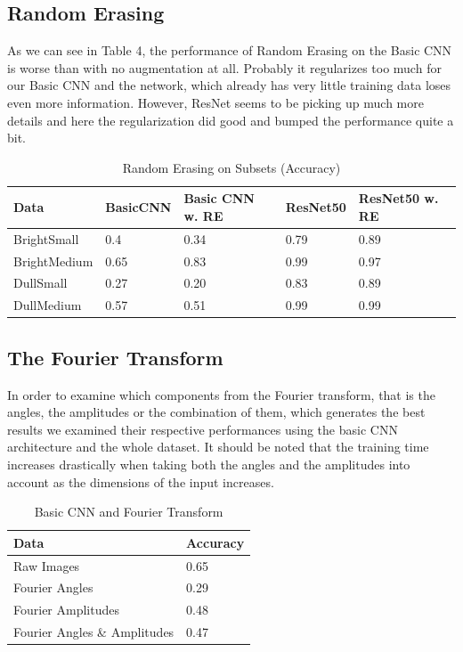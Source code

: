 \documentclass{article}
\begin{document}
\subsection{Random Erasing}

As we can see in Table 4, the performance of Random Erasing on the Basic CNN is worse than with no augmentation at all. Probably it regularizes too much for our Basic CNN and the network, which already has very little training data loses even more information. However, ResNet seems to be picking up much more details and here the regularization did good and bumped the performance quite a bit. 

\begin{table}[H]
	\caption{Random Erasing on Subsets (Accuracy)}
	\label{sample-table}
	\centering
	\begin{tabular}{lllll}
		\toprule
		Data & BasicCNN & Basic CNN w. RE & ResNet50 & ResNet50 w. RE \\
		\midrule
		BrightSmall   & 0.4 & 0.34 & 0.79 & 0.89  \\
		BrightMedium  & 0.65 & 0.83 & 0.99 & 0.97  \\
		DullSmall     & 0.27 & 0.20 & 0.83 & 0.89  \\
		DullMedium    & 0.57 & 0.51 & 0.99 & 0.99  \\
		\bottomrule
	\end{tabular}
\end{table}



\subsection{The Fourier Transform}

In order to examine which components from the Fourier transform, that is the angles, the amplitudes or the combination of them, which generates the best results we examined their respective performances using the basic CNN architecture and the whole dataset. It should be noted that the training time increases drastically when taking both the angles and the amplitudes into account as the dimensions of the input increases.

\begin{table}[H]
  \caption{Basic CNN and Fourier Transform}
  \label{sample-table}
  \centering
  \begin{tabular}{ll}
    \toprule
    Data & Accuracy \\
    \midrule
    Raw Images  & 0.65 \\
    Fourier Angles & 0.29   \\
    Fourier Amplitudes & 0.48 \\
    Fourier Angles \& Amplitudes & 0.47 \\
    \bottomrule
  \end{tabular}
\end{table}
\end{document}
